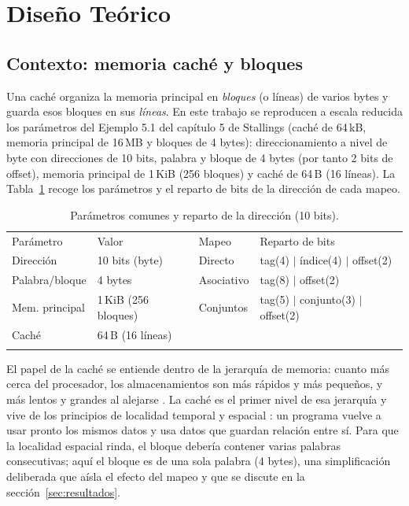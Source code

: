 \documentclass[llncs]{llncs}
\begin{document}
\section{Diseño Teórico}
\label{sec:diseno}

\subsection{Contexto: memoria caché y bloques}

Una caché organiza la memoria principal en \emph{bloques} (o
líneas) de varios bytes y guarda esos bloques en sus \emph{líneas}.
En este trabajo se reproducen a escala reducida los parámetros del
Ejemplo 5.1 del capítulo 5 de Stallings \cite{stallings2019} (caché de
64\,kB, memoria principal de 16\,MB y bloques de 4 bytes):
direccionamiento a nivel de byte
con direcciones de 10 bits, palabra y bloque de 4 bytes (por tanto 2
bits de offset), memoria principal de 1\,KiB (256 bloques) y caché de
64\,B (16 líneas). La Tabla~\ref{tab:par} recoge los parámetros y el
reparto de bits de la dirección de cada mapeo.

\begin{table}[t]
\centering
\caption{Parámetros comunes y reparto de la dirección (10 bits).}
\label{tab:par}
\small
\begin{tabular}{llll}
\hline\noalign{\smallskip}
Parámetro & Valor & Mapeo & Reparto de bits\\
\noalign{\smallskip}\hline\noalign{\smallskip}
Dirección & 10 bits (byte) & Directo & tag(4) $\vert$ índice(4) $\vert$ offset(2)\\
Palabra/bloque & 4 bytes & Asociativo & tag(8) $\vert$ offset(2)\\
Mem. principal & 1\,KiB (256 bloques) & Conjuntos & tag(5) $\vert$ conjunto(3) $\vert$ offset(2)\\
Caché & 64\,B (16 líneas) & & \\
\noalign{\smallskip}\hline
\end{tabular}
\end{table}

El papel de la caché se entiende dentro de la jerarquía de memoria:
cuanto más cerca del procesador, los almacenamientos son más rápidos y
más pequeños, y más lentos y grandes al alejarse
\cite{tanenbaum2013,hamacher2002,wikipedia-locality}. La caché es el primer nivel
de esa jerarquía y vive de los principios de localidad temporal y
espacial \cite{wikipedia-locality,stallings2019,smith1982}: un programa vuelve
a usar pronto los mismos datos y usa datos que guardan relación entre
sí. Para que la localidad espacial rinda, el bloque debería contener
varias palabras consecutivas; aquí el bloque es de una sola palabra
(4 bytes), una simplificación deliberada que aísla el efecto del
mapeo y que se discute en la sección~\ref{sec:resultados}.
\end{document}
